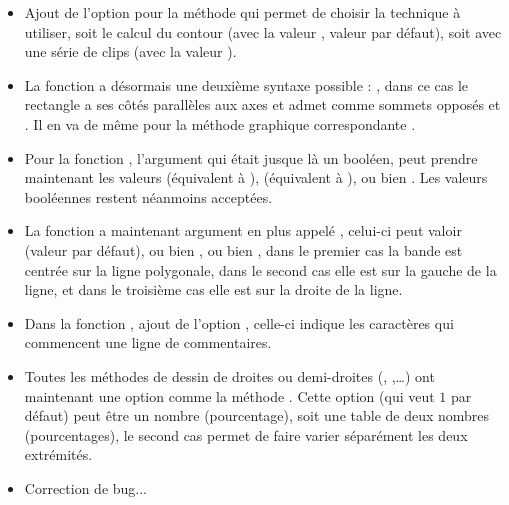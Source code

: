 \begin{itemize}
    \item Ajout de l'option  pour la méthode  qui permet de choisir la technique à utiliser, soit le calcul du contour (avec la valeur \false, valeur par défaut), soit avec une série de clips (avec la valeur \true).
    
    \item La fonction  a désormais une deuxième syntaxe possible : , dans ce cas le rectangle a ses côtés parallèles aux axes et admet comme sommets opposés  et . Il en va de même pour la méthode graphique correspondante .
    
    \item Pour la fonction , l'argument  qui était jusque là un booléen, peut prendre maintenant les valeurs  (équivalent à \false),  (équivalent à \true), ou bien . Les valeurs booléennes restent néanmoins acceptées.
    
    \item La fonction  a maintenant argument en plus appelé , celui-ci peut valoir  (valeur par défaut), ou bien , ou bien , dans le premier cas la bande est centrée sur la ligne polygonale, dans le second cas elle est sur la gauche de la ligne, et dans le troisième cas elle est sur la droite de la ligne.
    
    \item Dans la fonction , ajout de l'option , celle-ci indique les caractères qui commencent une ligne de commentaires.
    
    \item Toutes les méthodes de dessin de droites ou demi-droites (, ,\ldots) ont maintenant une option  comme la méthode . Cette option (qui veut $1$ par défaut) peut être un nombre (pourcentage), soit une table de deux nombres (pourcentages), le second cas permet de faire varier séparément les deux extrémités.
    
    \item Correction de bug...
\end{itemize}

